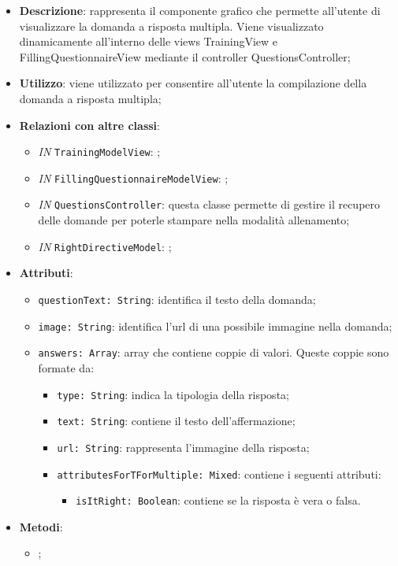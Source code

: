 		\begin{itemize}
			\item \textbf{Descrizione}: rappresenta il componente grafico che permette all'utente di visualizzare la domanda a risposta multipla. Viene visualizzato dinamicamente all'interno delle views TrainingView e FillingQuestionnaireView mediante il controller QuestionsController;
			\item \textbf{Utilizzo}: viene utilizzato per consentire all'utente la compilazione della domanda a risposta multipla;
			\item \textbf{Relazioni con altre classi}: 
			\begin{itemize}
				\item \textit{IN} \texttt{TrainingModelView}: ; 
				\item \textit{IN} \texttt{FillingQuestionnaireModelView}: ;
				\item \textit{IN} \texttt{QuestionsController}: questa classe permette di gestire il recupero delle domande per poterle stampare nella modalità allenamento;
				\item \textit{IN} \texttt{RightDirectiveModel}: ;
			\end{itemize}
			\item \textbf{Attributi}: 
			\begin{itemize}
				\item \texttt{questionText: String}: identifica il testo della domanda;
				\item \texttt{image: String}: identifica l'url di una possibile immagine nella domanda;
				\item \texttt{answers: Array}: array che contiene coppie di valori. Queste coppie sono formate da:
				\begin{itemize}
					\item \texttt{type: String}: indica la tipologia della risposta;
					\item \texttt{text: String}: contiene il testo dell'affermazione;
					\item \texttt{url: String}: rappresenta l'immagine della risposta;
					\item \texttt{attributesForTForMultiple: Mixed}: contiene i seguenti attributi:
					\begin{itemize}
						\item \texttt{isItRight: Boolean}: contiene se la risposta è vera o falsa.
					\end{itemize}
				\end{itemize}
			\end{itemize}
			 
			\item \textbf{Metodi}: 
			\begin{itemize}
				\item ;
			\end{itemize}
		\end{itemize}
		
